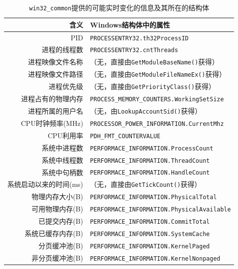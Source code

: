\documentclass{beamer}
\newcommand\code[1]{\texttt{#1}}
\begin{document}
\begin{frame}
    
\begin{table}[htb]
    \centering
    \begin{tabular}{rl}
        \hline
        含义 & Windows结构体中的属性 \\
        \hline
        PID & \code{PROCESSENTRY32.th32ProcessID} \\
        进程的线程数 & \code{PROCESSENTRY32.cntThreads} \\
        进程映像文件名称 & （无，直接由\code{GetModuleBaseName()}获得） \\
        进程映像文件路径 & （无，直接由\code{GetModuleFileNameEx()}获得） \\
        进程优先级 & （无，直接由\code{GetPriorityClass()}获得） \\
        进程占有的物理内存 & \code{PROCESS\_MEMORY\_COUNTERS.WorkingSetSize} \\
        进程所属的用户名 & （无，由\code{LookupAccountSid()}获得） \\
        CPU时钟频率(MHz) & \code{PROCESSOR\_POWER\_INFORMATION.CurrentMhz} \\
        CPU利用率 & \code{PDH\_FMT\_COUNTERVALUE} \\
        系统中进程数 & \code{PERFORMACE\_INFORMATION.ProcessCount} \\
        系统中线程数 & \code{PERFORMACE\_INFORMATION.ThreadCount} \\
        系统中句柄数 & \code{PERFORMACE\_INFORMATION.HandleCount} \\
        系统启动以来的时间(ms) & （无，直接由\code{GetTickCount()}获得） \\
        物理内存大小(B) & \code{PERFORMACE\_INFORMATION.PhysicalTotal} \\
        可用物理内存(B) & \code{PERFORMACE\_INFORMATION.PhysicalAvailable} \\
        已提交内存(B) & \code{PERFORMACE\_INFORMATION.CommitTotal} \\
        系统已缓存内存(B) & \code{PERFORMACE\_INFORMATION.SystemCache} \\
        分页缓冲池(B) & \code{PERFORMACE\_INFORMATION.KernelPaged} \\
        非分页缓冲池(B) & \code{PERFORMACE\_INFORMATION.KernelNonpaged} \\
        \hline
    \end{tabular}
    \caption{\code{win32\_common}提供的可能实时变化的信息及其所在的结构体}
    \label{table:field.struc}
\end{table}
\end{frame}
\end{document}

